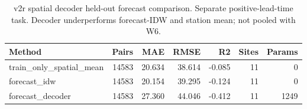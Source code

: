 \begin{table}[t]
\centering
\footnotesize
\caption{v2r spatial decoder held-out forecast comparison. Separate positive-lead-time task. Decoder underperforms forecast-IDW and station mean; not pooled with W6.}
\label{tab:t04b}
\begin{tabular}{lrrrrrr}
\hline
Method & Pairs & MAE & RMSE & R2 & Sites & Params \\
\hline
train\_only\_spatial\_mean & 14583 & 20.634 & 38.614 & -0.085 & 11 & 0 \\
forecast\_idw & 14583 & 20.154 & 39.295 & -0.124 & 11 & 0 \\
forecast\_decoder & 14583 & 27.360 & 44.046 & -0.412 & 11 & 1249 \\
\hline
\end{tabular}
\end{table}
